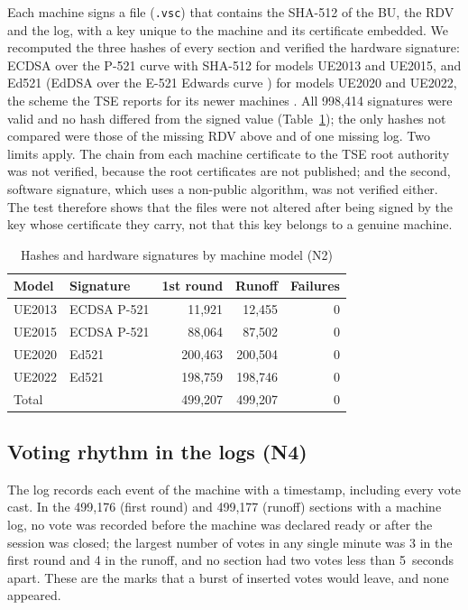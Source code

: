 Each machine signs a file (\texttt{.vsc}) that contains the SHA-512
\cite{fips180} of the BU, the RDV and the log, with a key unique to the
machine and its certificate embedded. We recomputed the three hashes of every
section and verified the hardware signature: ECDSA over the P-521 curve with
SHA-512 \cite{fips186} for models UE2013 and UE2015, and Ed521 (EdDSA over
the E-521 Edwards curve \cite{aranha2013,fips186}) for models UE2020 and
UE2022, the scheme the TSE reports for its newer machines \cite{tse2023tps}.
All 998,414 signatures were valid and no hash differed from the signed value
(Table~\ref{tab:n2}); the only hashes not compared were those of the missing
RDV above and of one missing log. Two limits apply. The chain from each
machine certificate to the TSE root authority was not verified, because the
root certificates are not published; and the second, software signature,
which uses a non-public algorithm, was not verified either. The test
therefore shows that the files were not altered after being signed by the
key whose certificate they carry, not that this key belongs to a genuine
machine.

\begin{table}[ht]
\caption{Hashes and hardware signatures by machine model (N2)}
\label{tab:n2}
\centering\scriptsize
\begin{tabular}{@{}l l r r r@{}}
\toprule
\textbf{Model} & \textbf{Signature} & \textbf{1st round} & \textbf{Runoff} & \textbf{Failures} \\
\midrule
UE2013 & ECDSA P-521 & 11,921 & 12,455 & 0 \\
UE2015 & ECDSA P-521 & 88,064 & 87,502 & 0 \\
UE2020 & Ed521 & 200,463 & 200,504 & 0 \\
UE2022 & Ed521 & 198,759 & 198,746 & 0 \\
\midrule
Total & & 499,207 & 499,207 & 0 \\
\bottomrule
\end{tabular}
\end{table}

\subsection{Voting rhythm in the logs (N4)}

The log records each event of the machine with a timestamp, including every
vote cast. In the 499,176 (first round) and 499,177 (runoff) sections with a
machine log, no vote was recorded before the machine was declared ready or
after the session was closed; the largest number of votes in any single
minute was 3 in the first round and 4 in the runoff, and no section had two
votes less than 5~seconds apart. These are the marks that a burst of
inserted votes would leave, and none appeared.

